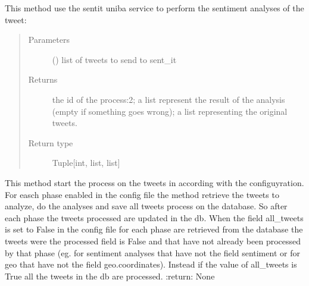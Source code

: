 \documentclass[letterpaper,10pt,english]{sphinxmanual}
\begin{document}
\begin{fulllineitems}
\begin{fulllineitems}
\label{\detokenize{code_comment/tweet_processor:hate_tweet_map.tweets_processor.TweetProcessor.ProcessTweet.__sent_it_analyze_sentiment2}}
\sphinxAtStartPar
This method use the sent\sphinxhyphen{}it uniba service to perform the sentiment analyses of the tweet:
\begin{quote}\begin{description}
\item[{Parameters}] \leavevmode
\sphinxAtStartPar
{} () \textendash{} list of tweets to send to sent\_it

\item[{Returns}] \leavevmode
\sphinxAtStartPar
the id of the process:2; a list represent the result of the analysis (empty if something goes wrong); a list representing the original tweets.

\item[{Return type}] \leavevmode
\sphinxAtStartPar
Tuple{[}int, list, list{]}

\end{description}\end{quote}

\end{fulllineitems}


\begin{fulllineitems}
\label{\detokenize{code_comment/tweet_processor:hate_tweet_map.tweets_processor.TweetProcessor.ProcessTweet.start}}
\sphinxAtStartPar
This method start the process on the tweets in according with the configuyration.
For easch phase enabled in the config file the method retrieve the tweets to analyze,
do the analyses and save all tweets process on the database.
So after each phase the tweets processed are updated in the db.
When the field all\_tweets is set to False in the config file for each phase are retrieved from the database
the tweets were the processed field is False and that have not already been processed by that phase
(eg. for sentiment analyses that have not the field sentiment  or for geo that have not the field geo.coordinates).
Instead if the value of all\_tweets is True all the tweets in the db are processed.
:return: None

\end{fulllineitems}


\end{fulllineitems}
\end{document}

